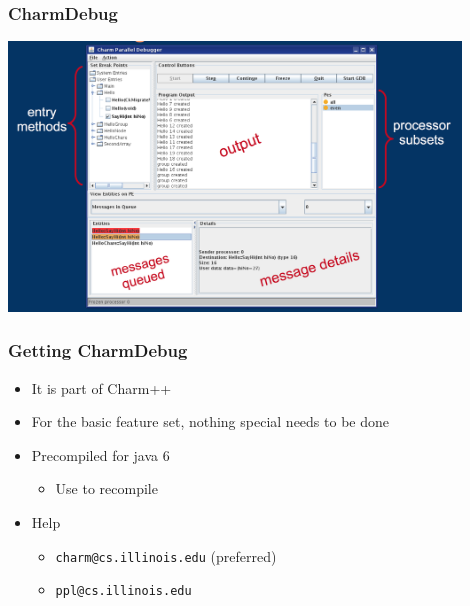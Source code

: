 \begin{frame}[fragile]
  \frametitle{CharmDebug}
  \begin{center}\includegraphics[width=0.9\textwidth]{figures/debugMainView.png}\end{center}
\end{frame}

\begin{frame}[fragile]
  \frametitle{Getting CharmDebug}
  \begin{itemize}
    \item It is part of Charm++
    \item For the basic feature set, nothing special needs to be done
    \item Precompiled for java 6
      \begin{itemize}
      \item Use  to recompile
      \end{itemize}
    \item Help
      \begin{itemize}
      \item \verb|charm@cs.illinois.edu| (preferred)
      \item \verb|ppl@cs.illinois.edu|
      \end{itemize}
  \end{itemize}
\end{frame}

